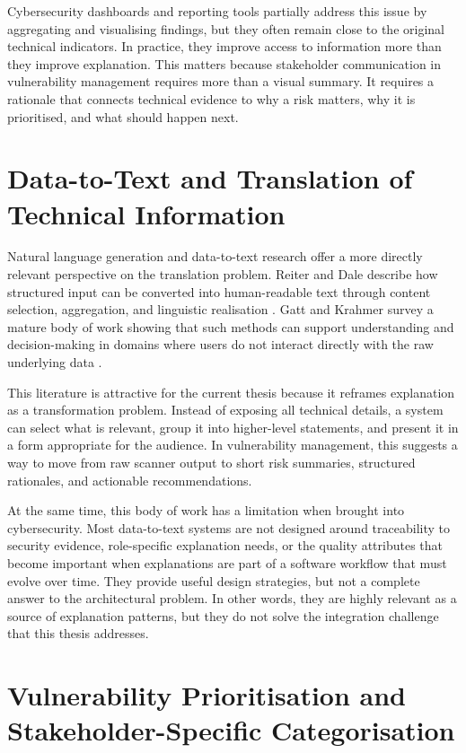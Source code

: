 Cybersecurity dashboards and reporting tools partially address this issue by aggregating and visualising findings, but they often remain close to the original technical indicators. In practice, they improve access to information more than they improve explanation. This matters because stakeholder communication in vulnerability management requires more than a visual summary. It requires a rationale that connects technical evidence to why a risk matters, why it is prioritised, and what should happen next.

\section{Data-to-Text and Translation of Technical Information}

Natural language generation and data-to-text research offer a more directly relevant perspective on the translation problem. Reiter and Dale describe how structured input can be converted into human-readable text through content selection, aggregation, and linguistic realisation \cite{reiter2000nlg}. Gatt and Krahmer survey a mature body of work showing that such methods can support understanding and decision-making in domains where users do not interact directly with the raw underlying data \cite{gatt2018survey}.

This literature is attractive for the current thesis because it reframes explanation as a transformation problem. Instead of exposing all technical details, a system can select what is relevant, group it into higher-level statements, and present it in a form appropriate for the audience. In vulnerability management, this suggests a way to move from raw scanner output to short risk summaries, structured rationales, and actionable recommendations.

At the same time, this body of work has a limitation when brought into cybersecurity. Most data-to-text systems are not designed around traceability to security evidence, role-specific explanation needs, or the quality attributes that become important when explanations are part of a software workflow that must evolve over time. They provide useful design strategies, but not a complete answer to the architectural problem. In other words, they are highly relevant as a source of explanation patterns, but they do not solve the integration challenge that this thesis addresses.

\section{Vulnerability Prioritisation and Stakeholder-Specific Categorisation}

